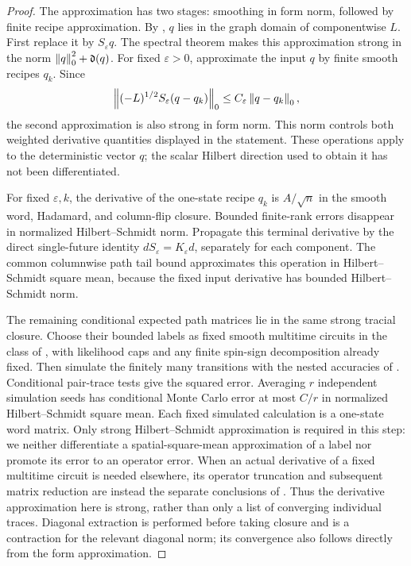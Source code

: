 \begin{proof}
The approximation has two stages: smoothing in form norm, followed by
finite recipe approximation.  By
, $q$ lies in the graph
domain of componentwise $L$.  First replace it by $S_\varepsilon q$.
The spectral theorem makes this approximation strong in the norm
$\left\lVert q\right\rVert_0^2+\mathfrak d(q)$.  For fixed $\varepsilon>0$, approximate the
input $q$ by finite smooth recipes $q_k$.  Since
\[
 \left\lVert (-L)^{1/2}S_\varepsilon(q-q_k)\right\rVert_0
 \le C_\varepsilon\left\lVert q-q_k\right\rVert_0,
\]
the second approximation is also strong in form norm.  This norm
controls both weighted derivative quantities displayed in the statement.
These operations apply to the deterministic vector $q$; the scalar
Hilbert direction used to obtain it has not been differentiated.

For fixed $\varepsilon,k$, the derivative of the one-state recipe
$q_k$ is $A/\sqrt n$ in the smooth word, Hadamard, and column-flip
closure.  Bounded finite-rank errors disappear in normalized
Hilbert--Schmidt norm.  Propagate this terminal derivative by the direct
single-future identity $dS_\varepsilon=K_\varepsilon d$, separately for
each component.  The common columnwise path tail bound approximates this
operation in Hilbert--Schmidt square mean, because the fixed input
derivative has bounded Hilbert--Schmidt norm.

The remaining conditional expected path matrices lie in the same strong
tracial closure.  Choose their bounded labels as fixed smooth multitime
circuits in the class of , with likelihood
caps and any finite spin-sign decomposition already fixed.  Then
simulate the finitely many transitions with the nested accuracies of
.  Conditional pair-trace tests give the squared
error.  Averaging $r$ independent simulation seeds has conditional
Monte Carlo error at most $C/r$ in normalized Hilbert--Schmidt square
mean.  Each fixed simulated calculation is a one-state word matrix.
Only strong Hilbert--Schmidt approximation is required in this step:
we neither differentiate a spatial-square-mean approximation of a label
nor promote its error to an operator error.  When an actual derivative
of a fixed multitime circuit is needed elsewhere, its operator
truncation and subsequent matrix reduction are instead the separate
conclusions of
.
Thus the derivative approximation here is strong, rather than only a
list of converging individual traces.  Diagonal extraction is performed
before taking closure and is a contraction for the relevant diagonal
norm; its convergence also follows directly from the form approximation.


\end{proof}
